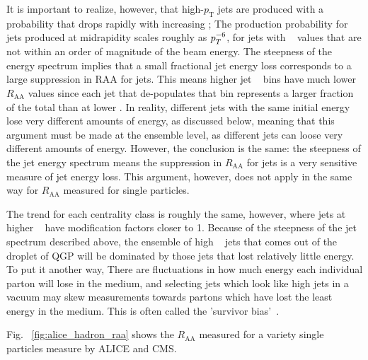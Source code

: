   It is important to realize, however, that high-$p_\mathrm{T}$ jets are produced with a probability that drops rapidly with increasing \pT; The production probability for jets produced at midrapidity scales roughly as $p_T^{-6}$, for jets with \pT~ values that are not within an order of magnitude of the beam energy. The steepness of the energy spectrum implies that a small fractional jet energy loss corresponds to a large suppression in RAA for jets. This means higher jet \pT~ bins have much lower $R_\mathrm{AA}$ values since each jet that de-populates that bin represents a larger fraction of the total than at lower \pT. In reality, different jets with the same initial energy lose very different amounts of energy, as discussed below, meaning that this argument must be made at the ensemble level, as different jets can loose very different amounts of energy. However, the conclusion is the same: the steepness of the jet energy spectrum means the suppression in $R_\mathrm{AA}$ for jets is a very sensitive measure of jet energy loss. This argument, however, does not apply in the same way for $R_\mathrm{AA}$ measured for single particles.

  The trend for each centrality class is roughly the same, however, where jets at higher \pT~ have modification factors closer to 1. Because of the steepness of the jet spectrum described above, the ensemble of high \pT~ jets that comes out of the droplet of QGP will be dominated by those jets that lost relatively little energy. To put it another way, There are fluctuations in how much energy each individual parton will lose in the medium, and selecting jets which look like high \pt jets in a vacuum may skew measurements towards partons which have lost the least energy in the medium. This is often called the 'survivor bias'~\cite{Connors2018}.

  Fig.~ \ref{fig:alice_hadron_raa} shows the $R_\mathrm{AA}$ measured for a variety single particles \cite{Bencedi2016} measure by ALICE and CMS. 

